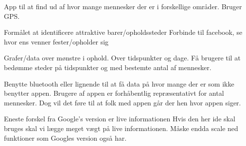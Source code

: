 
App til at find ud af hvor mange mennesker der er i forskellige områder. Bruger GPS.

Formålet at identificere attraktive barer/opholdssteder
Forbinde til facebook, se hvor ens venner fester/opholder sig

Grafer/data over mønstre i ophold. Over tidspunkter og dage. Få brugere til at bedømme steder på tidspunkter og med bestemte antal af mennesker.

Benytte bluetooth eller lignende til at få data på hvor mange der er som ikke benytter appen. Brugere af appen er forhåbentlig repræsentativt for antal mennesker. Dog vil det føre til at folk med appen går der hen hvor appen siger.

Eneste forskel fra Google's version er live informationen
    Hvis den her ide skal bruges skal vi lægge meget vægt på live informationen. Måske endda scale ned funktioner som Googles version også har.




